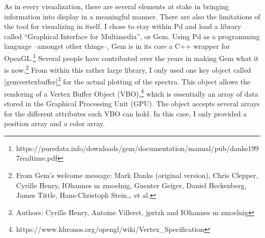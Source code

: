 \documentclass{article}
\begin{document}
As in every visualization, there are several elements at stake in bringing information into display in a meaningful manner. There are also the limitations of the tool for visualizing in itself. I chose to stay within Pd and load a library called ``Graphical Interface for Multimedia'', or Gem. Using Pd as a programming language --amongst other things--, Gem is in its core a C++ wrapper for OpenGL.\footnote{https://puredata.info/downloads/gem/documentation/manual/pub/danks1997realtime.pdf} Several people have contributed over the years in making Gem what it is now.\footnote{From Gem's welcome message: Mark Danks (original version), Chris Clepper, Cyrille Henry, IOhannes m zmoelnig, Guenter Geiger, Daniel Heckenberg, James Tittle, Hans-Christoph Stein{\dots} et al.} From within this rather large library, I only used one key object called [gemvertexbuffer]\footnote{Authors: Cyrille Henry, Antoine Villeret, jprtzk and IOhannes m zmoelnig} for the actual plotting of the spectra. This object allows the rendering of a Vertex Buffer Object (VBO),\footnote{https://www.khronos.org/opengl/wiki/Vertex\_Specification} which is essentially an array of data stored in the Graphical Processing Unit (GPU). The object accepts several arrays for the different attributes such VBO can hold. In this case, I only provided a position array and a color array. 
\end{document}
